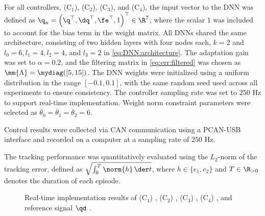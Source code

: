 \documentclass[journal]{IEEEtran}
\begin{document}
\hfill

For all controllers, \ie (C$_1$), (C$_2$), (C$_3$), and (C$_4$), the input vector to the DNN was defined as ${\q}_n=\left(\q^\top,\dq^\top,\fe^\top,1\right)^\top\in\R^{7}$, where the scalar $1$ was included to account for the bias term in the weight matrix.
All DNNs shared the same architecture, consisting of two hidden layers with four nodes each, \ie $k=2$ and $l_0=6, l_1=4, l_2=4$, and $l_3=2$ in \eqref{eq:DNN:architecture}.
The adaptation gain was set to $\alpha = 0.2$, and the filtering matrix in \eqref{eq:err:filtered} was chosen as $\mm{\Lambda}=\mydiag([5,15])$.
The DNN weights were initialized using a uniform distribution in the range $[-0.1, 0.1]$, with the same random seed used across all experiments to ensure consistency.
The controller sampling rate was set to $250$ Hz to support real-time implementation.
Weight norm constraint parameters were selected as $\overline\theta_0=\overline\theta_1=\overline\theta_2=6$.

Control results were collected via CAN communication using a PCAN-USB interface and recorded on a computer at a sampling rate of $250$ Hz.

The tracking performance was quantitatively evaluated using the $L_2$-norm of the tracking error, defined as $\sqrt{\int_0^T\norm{h}\,\der t}$, where $h\in\{e_1,e_2\}$ and $T\in\R_{>0}$ denotes the duration of each episode.

\begin{figure}[t]
  \centering
    \hfill
    \vfill
    \hfill
        \vfill
    \hfill
    \caption{
    Real-time implementation results of (C$_1$) \protect{}, (C$_2$) \protect{}, (C$_3$) \protect{}, (C$_4$) \protect{}, and reference signal $\qd$ \protect{}.
  }
\label{fig:ctrl:result}
\end{figure}
\end{document}
